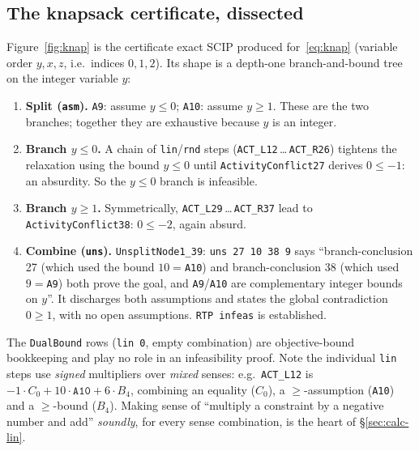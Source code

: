 \documentclass[runningheads]{llncs}
\newcommand{\code}[1]{\texttt{#1}}
\newcommand{\scip}{\textsc{SCIP}}
\begin{document}
\subsection{The knapsack certificate, dissected}\label{sec:knap-dissect}
Figure~\ref{fig:knap} is the certificate exact \scip{} produced for~\eqref{eq:knap}
(variable order $y,x,z$, i.e.\ indices $0,1,2$). Its shape is a depth-one
branch-and-bound tree on the integer variable $y$:
\begin{enumerate}
\item \textbf{Split (\code{asm}).} \code{A9}: assume $y\le0$; \code{A10}: assume $y\ge1$.
      These are the two branches; together they are exhaustive because $y$ is an integer.
\item \textbf{Branch $y\le0$.} A chain of \code{lin}/\code{rnd} steps
      (\code{ACT\_L12}\,\dots\,\code{ACT\_R26}) tightens the relaxation using the bound
      $y\le0$ until \code{ActivityConflict27} derives $0\le-1$: an absurdity. So the
      $y\le0$ branch is infeasible.
\item \textbf{Branch $y\ge1$.} Symmetrically, \code{ACT\_L29}\,\dots\,\code{ACT\_R37}
      lead to \code{ActivityConflict38}: $0\le-2$, again absurd.
\item \textbf{Combine (\code{uns}).} \code{UnsplitNode1\_39}:
      \code{uns 27 10 38 9} says ``branch-conclusion 27 (which used the bound
      $10=$\code{A10}) and branch-conclusion 38 (which used $9=$\code{A9}) both prove the
      goal, and \code{A9}/\code{A10} are complementary integer bounds on $y$''. It
      discharges both assumptions and states the global contradiction $0\ge1$, with no
      open assumptions. \code{RTP infeas} is established.
\end{enumerate}
The \code{DualBound} rows (\code{lin 0}, empty combination) are objective-bound
bookkeeping and play no role in an infeasibility proof. Note the individual \code{lin}
steps use \emph{signed} multipliers over \emph{mixed} senses: e.g.\ \code{ACT\_L12} is
$-1\cdot C_0 + 10\cdot\code{A10} + 6\cdot B_4$, combining an equality ($C_0$), a
$\ge$-assumption (\code{A10}) and a $\ge$-bound ($B_4$). Making sense of ``multiply a
constraint by a negative number and add'' \emph{soundly}, for every sense combination,
is the heart of \S\ref{sec:calc-lin}.
\end{document}
